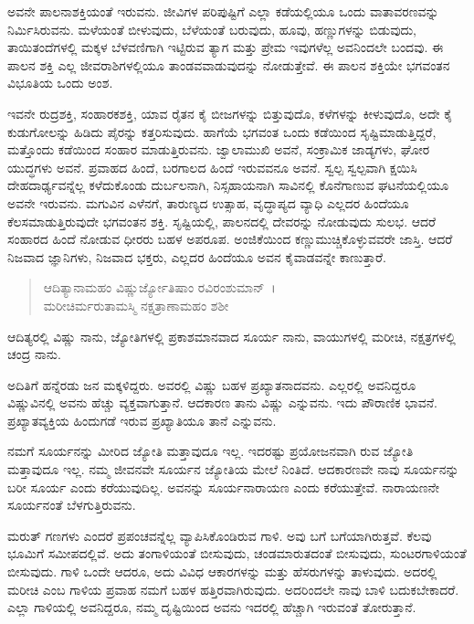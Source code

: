 ಅವನೇ ಪಾಲನಾಶಕ್ತಿಯಂತೆ ಇರುವನು. ಜೀವಿಗಳ ಪರಿಪುಷ್ಟಿಗೆ ಎಲ್ಲಾ ಕಡೆಯಲ್ಲಿಯೂ ಒಂದು ವಾತಾವರಣವನ್ನು ನಿರ್ಮಿಸಿರುವನು. ಮಳೆಯಂತೆ ಬೀಳುವುದು, ಬೆಳೆಯಂತೆ ಬರುವುದು, ಹೂವು, ಹಣ್ಣುಗಳನ್ನು ಬಿಡುವುದು, ತಾಯಿತಂದೆಗಳಲ್ಲಿ ಮಕ್ಕಳ ಬೆಳವಣಿಗಾಗಿ ಇಟ್ಟಿರುವ ತ್ಯಾಗ ಮತ್ತು ಪ್ರೇಮ ಇವುಗಳೆಲ್ಲ ಅವನಿಂದಲೇ ಬಂದವು. ಈ ಪಾಲನ ಶಕ್ತಿ ಎಲ್ಲ ಜೀವರಾಶಿಗಳಲ್ಲಿಯೂ ತಾಂಡವವಾಡುವುದನ್ನು ನೋಡುತ್ತೇವೆ. ಈ ಪಾಲನ ಶಕ್ತಿಯೇ ಭಗವಂತನ ವಿಭೂತಿಯ ಒಂದು ಅಂಶ.

ಇವನೇ ರುದ್ರಶಕ್ತಿ, ಸಂಹಾರಕಶಕ್ತಿ, ಯಾವ ರೈತನ ಕೈ ಬೀಜಗಳನ್ನು ಬಿತ್ತುವುದೊ, ಕಳೆಗಳನ್ನು ಕೀಳುವುದೊ, ಅದೇ ಕೈ ಕುಡುಗೋಲನ್ನು ಹಿಡಿದು ಪೈರನ್ನು ಕತ್ತರಿಸುವುದು. ಹಾಗೆಯೆ ಭಗವಂತ ಒಂದು ಕಡೆಯಿಂದ ಸೃಷ್ಟಿಮಾಡುತ್ತಿದ್ದರೆ, ಮತ್ತೊಂದು ಕಡೆಯಿಂದ ಸಂಹಾರ ಮಾಡುತ್ತಿರುವನು. ಜ್ವಾಲಾಮುಖಿ ಅವನೆ, ಸಂಕ್ರಾಮಿಕ ಜಾಡ್ಯಗಳು, ಘೋರ ಯುದ್ಧಗಳು ಅವನೆ. ಪ್ರವಾಹದ ಹಿಂದೆ, ಬರಗಾಲದ ಹಿಂದೆ ಇರುವವನೂ ಅವನೆ. ಸ್ವಲ್ಪ ಸ್ವಲ್ಪವಾಗಿ ಕ್ಷಯಿಸಿ ದೇಹದಾರ್ಢ್ಯವನ್ನೆಲ್ಲ ಕಳೆದುಕೊಂಡು ದುರ್ಬಲನಾಗಿ, ನಿಸ್ಸಹಾಯನಾಗಿ ಸಾವಿನಲ್ಲಿ ಕೊನೆಗಾಣುವ ಘಟನೆಯಲ್ಲಿಯೂ ಅವನೇ ಇರುವನು. ಮಗುವಿನ ಎಳೆನಗೆ, ತಾರುಣ್ಯದ ಉತ್ಸಾಹ, ವೃದ್ಧಾಪ್ಯದ ವ್ಯಾಧಿ ಎಲ್ಲದರ ಹಿಂದೆಯೂ ಕೆಲಸಮಾಡುತ್ತಿರುವುದೇ ಭಗವಂತನ ಶಕ್ತಿ. ಸೃಷ್ಟಿಯಲ್ಲಿ, ಪಾಲನದಲ್ಲಿ ದೇವರನ್ನು ನೋಡುವುದು ಸುಲಭ. ಆದರೆ ಸಂಹಾರದ ಹಿಂದೆ ನೋಡುವ ಧೀರರು ಬಹಳ ಅಪರೂಪ. ಅಂಜಿಕೆಯಿಂದ ಕಣ್ಣುಮುಚ್ಚಿಕೊಳ್ಳುವವರೇ ಜಾಸ್ತಿ. ಆದರೆ ನಿಜವಾದ ಜ್ಞಾನಿಗಳು, ನಿಜವಾದ ಭಕ್ತರು, ಎಲ್ಲದರ ಹಿಂದೆಯೂ ಅವನ ಕೈವಾಡವನ್ನೇ ಕಾಣುತ್ತಾರೆ.

\begin{verse}
ಆದಿತ್ಯಾನಾಮಹಂ ವಿಷ್ಣುರ್ಜ್ಯೋತಿಷಾಂ ರವಿರಂಶುಮಾನ್~।\\ಮರೀಚಿರ್ಮರುತಾಮಸ್ಮಿ ನಕ್ಷತ್ರಾಣಾಮಹಂ ಶಶೀ 
\end{verse}

{\small ಆದಿತ್ಯರಲ್ಲಿ ವಿಷ್ಣು ನಾನು, ಜ್ಯೋತಿಗಳಲ್ಲಿ ಪ್ರಕಾಶಮಾನವಾದ ಸೂರ್ಯ ನಾನು, ವಾಯುಗಳಲ್ಲಿ ಮರೀಚಿ, ನಕ್ಷತ್ರಗಳಲ್ಲಿ ಚಂದ್ರ ನಾನು.}

ಅದಿತಿಗೆ ಹನ್ನೆರಡು ಜನ ಮಕ್ಕಳಿದ್ದರು. ಅವರಲ್ಲಿ ವಿಷ್ಣು ಬಹಳ ಪ್ರಖ್ಯಾತನಾದವನು. ಎಲ್ಲರಲ್ಲಿ ಅವನಿದ್ದರೂ ವಿಷ್ಣುವಿನಲ್ಲಿ ಅವನು ಹೆಚ್ಚು ವ್ಯಕ್ತವಾಗುತ್ತಾನೆ. ಆದಕಾರಣ ತಾನು ವಿಷ್ಣು ಎನ್ನುವನು. ಇದು ಪೌರಾಣಿಕ ಭಾವನೆ. ಪ್ರಖ್ಯಾತವ್ಯಕ್ತಿಯ ಹಿಂದುಗಡೆ ಇರುವ ಪ್ರಖ್ಯಾತಿಯೂ ತಾನೆ ಎನ್ನುವನು.

ನಮಗೆ ಸೂರ್ಯನನ್ನು ಮೀರಿದ ಜ್ಯೋತಿ ಮತ್ತಾವುದೂ ಇಲ್ಲ. ಇದರಷ್ಟು ಪ್ರಯೋಜನವಾಗಿ ರುವ ಜ್ಯೋತಿ ಮತ್ತಾವುದೂ ಇಲ್ಲ. ನಮ್ಮ ಜೀವನವೇ ಸೂರ್ಯನ ಜ್ಯೋತಿಯ ಮೇಲೆ ನಿಂತಿದೆ. ಆದಕಾರಣವೇ ನಾವು ಸೂರ್ಯನನ್ನು ಬರೀ ಸೂರ್ಯ ಎಂದು ಕರೆಯುವುದಿಲ್ಲ. ಅವನನ್ನು ಸೂರ್ಯನಾರಾಯಣ ಎಂದು ಕರೆಯುತ್ತೇವೆ. ನಾರಾಯಣನೇ ಸೂರ್ಯನಂತೆ ಬೆಳಗುತ್ತಿರುವನು.

ಮರುತ್ ಗಣಗಳು ಎಂದರೆ ಪ್ರಪಂಚವನ್ನೆಲ್ಲ ವ್ಯಾಪಿಸಿಕೊಂಡಿರುವ ಗಾಳಿ. ಅವು ಬಗೆ ಬಗೆಯಾಗಿರುತ್ತವೆ. ಕೆಲವು ಭೂಮಿಗೆ ಸಮೀಪದಲ್ಲಿವೆ. ಅದು ತಂಗಾಳಿಯಂತೆ ಬೀಸುವುದು, ಚಂಡಮಾರುತದಂತೆ ಬೀಸುವುದು, ಸುಂಟರಗಾಳಿಯಂತೆ ಬೀಸುವುದು. ಗಾಳಿ ಒಂದೇ ಆದರೂ, ಅದು ವಿವಿಧ ಆಕಾರಗಳನ್ನು ಮತ್ತು ಹೆಸರುಗಳನ್ನು ತಾಳುವುದು. ಅದರಲ್ಲಿ ಮರೀಚಿ ಎಂಬ ಗಾಳಿಯ ಪ್ರವಾಹ ನಮಗೆ ಬಹಳ ಹತ್ತಿರವಾಗಿರುವುದು. ಅದರಿಂದಲೇ ನಾವು ಬಾಳಿ ಬದುಕಬೇಕಾದರೆ. ಎಲ್ಲಾ ಗಾಳಿಯಲ್ಲಿ ಅವನಿದ್ದರೂ, ನಮ್ಮ ದೃಷ್ಟಿಯಿಂದ ಅವನು ಇದರಲ್ಲಿ ಹೆಚ್ಚಾಗಿ ಇರುವಂತೆ ತೋರುತ್ತಾನೆ.

